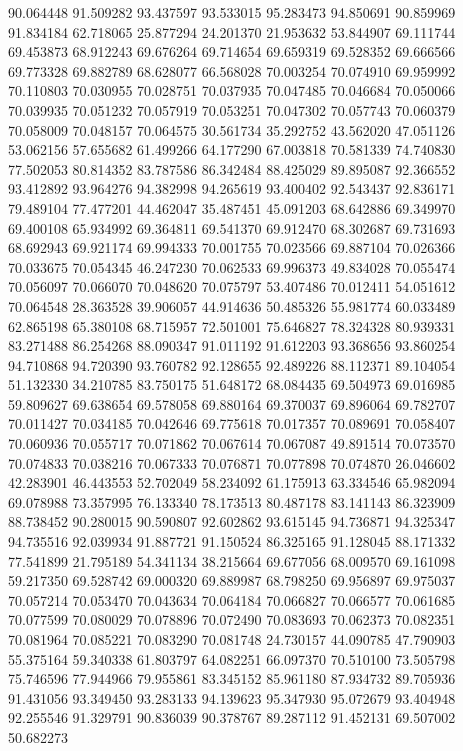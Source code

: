 90.064448
91.509282
93.437597
93.533015
95.283473
94.850691
90.859969
91.834184
62.718065
25.877294
24.201370
21.953632
53.844907
69.111744
69.453873
68.912243
69.676264
69.714654
69.659319
69.528352
69.666566
69.773328
69.882789
68.628077
66.568028
70.003254
70.074910
69.959992
70.110803
70.030955
70.028751
70.037935
70.047485
70.046684
70.050066
70.039935
70.051232
70.057919
70.053251
70.047302
70.057743
70.060379
70.058009
70.048157
70.064575
30.561734
35.292752
43.562020
47.051126
53.062156
57.655682
61.499266
64.177290
67.003818
70.581339
74.740830
77.502053
80.814352
83.787586
86.342484
88.425029
89.895087
92.366552
93.412892
93.964276
94.382998
94.265619
93.400402
92.543437
92.836171
79.489104
77.477201
44.462047
35.487451
45.091203
68.642886
69.349970
69.400108
65.934992
69.364811
69.541370
69.912470
68.302687
69.731693
68.692943
69.921174
69.994333
70.001755
70.023566
69.887104
70.026366
70.033675
70.054345
46.247230
70.062533
69.996373
49.834028
70.055474
70.056097
70.066070
70.048620
70.075797
53.407486
70.012411
54.051612
70.064548
28.363528
39.906057
44.914636
50.485326
55.981774
60.033489
62.865198
65.380108
68.715957
72.501001
75.646827
78.324328
80.939331
83.271488
86.254268
88.090347
91.011192
91.612203
93.368656
93.860254
94.710868
94.720390
93.760782
92.128655
92.489226
88.112371
89.104054
51.132330
34.210785
83.750175
51.648172
68.084435
69.504973
69.016985
59.809627
69.638654
69.578058
69.880164
69.370037
69.896064
69.782707
70.011427
70.034185
70.042646
69.775618
70.017357
70.089691
70.058407
70.060936
70.055717
70.071862
70.067614
70.067087
49.891514
70.073570
70.074833
70.038216
70.067333
70.076871
70.077898
70.074870
26.046602
42.283901
46.443553
52.702049
58.234092
61.175913
63.334546
65.982094
69.078988
73.357995
76.133340
78.173513
80.487178
83.141143
86.323909
88.738452
90.280015
90.590807
92.602862
93.615145
94.736871
94.325347
94.735516
92.039934
91.887721
91.150524
86.325165
91.128045
88.171332
77.541899
21.795189
54.341134
38.215664
69.677056
68.009570
69.161098
59.217350
69.528742
69.000320
69.889987
68.798250
69.956897
69.975037
70.057214
70.053470
70.043634
70.064184
70.066827
70.066577
70.061685
70.077599
70.080029
70.078896
70.072490
70.083693
70.062373
70.082351
70.081964
70.085221
70.083290
70.081748
24.730157
44.090785
47.790903
55.375164
59.340338
61.803797
64.082251
66.097370
70.510100
73.505798
75.746596
77.944966
79.955861
83.345152
85.961180
87.934732
89.705936
91.431056
93.349450
93.283133
94.139623
95.347930
95.072679
93.404948
92.255546
91.329791
90.836039
90.378767
89.287112
91.452131
69.507002
50.682273
